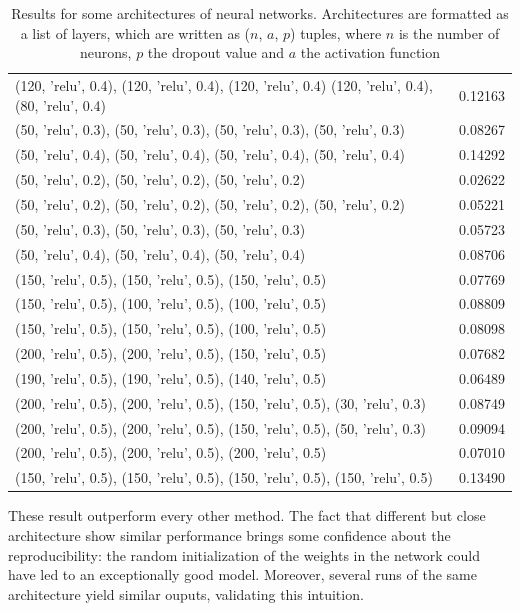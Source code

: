 \begin{table}[h!]
\begin{tabular}{|p{}|p{}|}
        (120, 'relu', 0.4), (120, 'relu', 0.4), (120, 'relu', 0.4) (120, 'relu', 0.4), (80, 'relu', 0.4) & 0.12163 \\
        (50, 'relu', 0.3), (50, 'relu', 0.3), (50, 'relu', 0.3), (50, 'relu', 0.3) & 0.08267 \\
        (50, 'relu', 0.4), (50, 'relu', 0.4), (50, 'relu', 0.4), (50, 'relu', 0.4) & 0.14292 \\
        (50, 'relu', 0.2), (50, 'relu', 0.2), (50, 'relu', 0.2) & 0.02622 \\
        (50, 'relu', 0.2), (50, 'relu', 0.2), (50, 'relu', 0.2), (50, 'relu', 0.2) & 0.05221 \\
        (50, 'relu', 0.3), (50, 'relu', 0.3), (50, 'relu', 0.3) & 0.05723 \\
        (50, 'relu', 0.4), (50, 'relu', 0.4), (50, 'relu', 0.4) & 0.08706 \\
        (150, 'relu', 0.5), (150, 'relu', 0.5), (150, 'relu', 0.5) & 0.07769 \\
        (150, 'relu', 0.5), (100, 'relu', 0.5), (100, 'relu', 0.5) & 0.08809 \\
        (150, 'relu', 0.5), (150, 'relu', 0.5), (100, 'relu', 0.5) & 0.08098 \\
        (200, 'relu', 0.5), (200, 'relu', 0.5), (150, 'relu', 0.5) & 0.07682 \\
        (190, 'relu', 0.5), (190, 'relu', 0.5), (140, 'relu', 0.5) & 0.06489 \\
        (200, 'relu', 0.5), (200, 'relu', 0.5), (150, 'relu', 0.5), (30, 'relu', 0.3) & 0.08749 \\
        (200, 'relu', 0.5), (200, 'relu', 0.5), (150, 'relu', 0.5), (50, 'relu', 0.3) & 0.09094 \\
        (200, 'relu', 0.5), (200, 'relu', 0.5), (200, 'relu', 0.5) & 0.07010 \\
        (150, 'relu', 0.5), (150, 'relu', 0.5), (150, 'relu', 0.5), (150, 'relu', 0.5) & 0.13490 \\ \hline
    \end{tabular}
    \caption{Results for some architectures of neural networks. Architectures are formatted as a list of layers, which are written as ($n$, $a$, $p$) tuples, where $n$ is the number of neurons, $p$ the dropout value and $a$ the activation function}
    \label{tab:nn-results}
\end{table}

These result outperform every other method. The fact that different but close architecture show similar performance brings some confidence about the reproducibility: the random initialization of the weights in the network could have led to an exceptionally good model. Moreover, several runs of the same architecture yield similar ouputs, validating this intuition.

